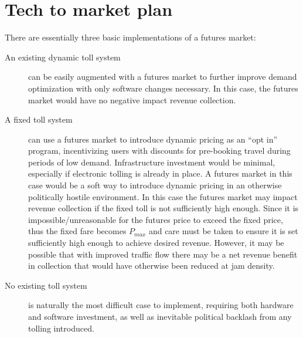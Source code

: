 \documentclass[10pt, letter, twocolumn]{article} %
\begin{document}
\section{Tech to market plan}
There are essentially three basic implementations of a futures market:
\begin{description}
    \item[An existing dynamic toll system] can be easily augmented with a futures market to further improve demand optimization with only software changes necessary. In this case, the futures market would have no negative impact revenue collection. 
    
    \item[A fixed toll system] can use a futures market to introduce dynamic pricing as an ``opt in'' program, incentivizing users with discounts for pre-booking travel during periods of low demand. Infrastructure investment would be minimal, especially if electronic tolling is already in place. A futures market in this case would be a soft way to introduce dynamic pricing in an otherwise politically hostile environment. In this case the futures market may impact revenue collection if the fixed toll is not sufficiently high enough. Since it is impossible/unreasonable for the futures price to exceed the fixed price, thus the fixed fare becomes $P_{max}$ and care must be taken to ensure it is set sufficiently high enough to achieve desired revenue. However, it may be possible that with improved traffic flow there may be a net revenue benefit in collection that would have otherwise been reduced at jam density.
    
    \item[No existing toll system] is naturally the most difficult case to implement, requiring both hardware and software investment, as well as inevitable political backlash from any tolling introduced.
\end{description}
\end{document}
